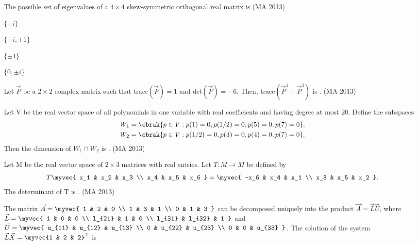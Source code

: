     \item The possible set of eigenvalues of a $4 \times 4$ skew-symmetric orthogonal real matrix is
    \hfill (MA 2013)
    \begin{enumerate}
    \begin{multicols}{4}
        \item $\{\pm i\}$
        \item $\{\pm i, \pm 1\}$
        \item $\{\pm 1\}$
        \item $\{0, \pm i\}$
        \end{multicols}
    \end{enumerate}
    \item Let $\vec{P}$ be a $2 \times 2$ complex matrix such that trace$(\vec{P})=1$ and det$(\vec{P})=-6$. Then, trace$(\vec{P}^4 - \vec{P}^3)$ is \underline{\hspace{1cm}}.
    \hfill (MA 2013)
    \item Let V be the real vector space of all polynomials in one variable with real coefficients and having degree at most 20. Define the subspaces 
	    \begin{align*}
W_1 &= \cbrak{p \in V : p(1)=0, p(1/2)=0, p(5)=0, p(7)=0}, \\
    W_2 &= \cbrak{p \in V : p(1/2)=0, p(3)=0, p(4)=0, p(7)=0}. 
	    \end{align*}
    Then the dimension of $W_1 \cap W_2$ is \underline{\hspace{1cm}}.
    \hfill (MA 2013)
    \item Let M be the real vector space of $2 \times 3$ matrices with real entries. Let $T: M \rightarrow M$ be defined by 
	    $$T{\myvec{ x_1 & x_2 & x_3 \\ x_4 & x_5 & x_6 }} = \myvec{ -x_6 & x_4 & x_1 \\ x_3 & x_5 & x_2 }.$$
    The determinant of T is \underline{\hspace{1cm}}.
    \hfill (MA 2013)
    \item The matrix $\vec{A} = \myvec{ 1 & 2 & 0 \\ 1 & 3 & 1 \\ 0 & 1 & 3 }$ can be decomposed uniquely into the product $\vec{A}=\vec{L}\vec{U}$, where $\vec{L} = \myvec{ 1 & 0 & 0 \\ l_{21} & 1 & 0 \\ l_{31} & l_{32} & 1 }$ and $\vec{U} = \myvec{ u_{11} & u_{12} & u_{13} \\ 0 & u_{22} & u_{23} \\ 0 & 0 & u_{33} }$. The solution of the system $\vec{L}\vec{X} = \myvec{1 & 2 & 2}^{\top}$ is
